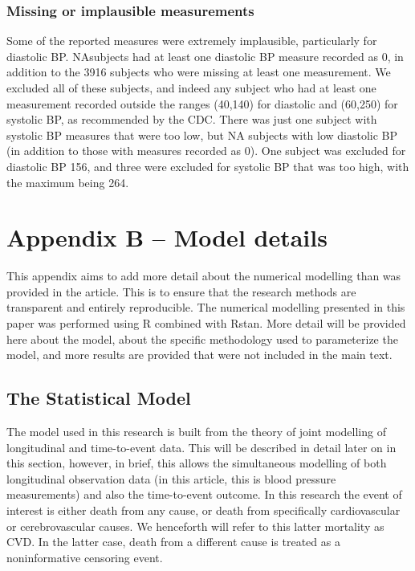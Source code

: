 \documentclass[
]{article}
\begin{document}
\hypertarget{sec:BPrange}{%
\subsubsection{Missing or implausible measurements}\label{sec:BPrange}}

Some of the reported measures were extremely implausible, particularly for diastolic BP. NAsubjects had at least one diastolic BP measure recorded as 0, in addition to the 3916 subjects who were missing at least one measurement. We excluded all of these subjects, and indeed any subject who had at least one measurement recorded outside the ranges (40,140) for diastolic and (60,250) for systolic BP, as recommended by the CDC.
There was just one subject with systolic BP measures that were too low, but NA subjects with low diastolic BP (in addition to those with measures recorded as 0).
One subject was excluded for diastolic BP 156, and three were excluded for systolic BP that was too high, with the maximum being 264.

\newpage

\hypertarget{appendix-b-model-details}{%
\section{Appendix B -- Model details}\label{appendix-b-model-details}}

This appendix aims to add more detail about the numerical modelling than was provided in the article. This is to ensure that the research methods are transparent and entirely reproducible. The numerical modelling presented in this paper was performed using R combined with Rstan. More detail will be provided here about the model, about the specific methodology used to parameterize the model, and more results are provided that were not included in the main text.

\hypertarget{the-statistical-model}{%
\subsection{The Statistical Model}\label{the-statistical-model}}

The model used in this research is built from the theory of joint modelling of longitudinal and time-to-event data. This will be described in detail later on in this section, however, in brief, this allows the simultaneous modelling of both longitudinal observation data (in this article, this is blood pressure measurements) and also the time-to-event outcome.
In this research the event of interest is either death from any cause, or death from specifically cardiovascular or cerebrovascular causes. We henceforth will refer to this latter mortality as CVD.
In the latter case, death from a different cause is treated as a noninformative censoring event.
\end{document}
